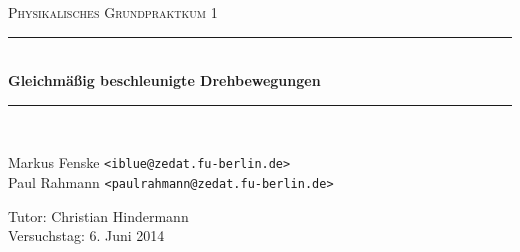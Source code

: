 \newcommand{\HRule}{\rule{\linewidth}{0.5mm}}

\begin{center}
  \textsc{\Large Physikalisches Grundpraktkum 1}
  \HRule\\[0.4 cm]
  {\huge \bfseries Gleichmäßig beschleunigte Drehbewegungen}
  \HRule\\[0.4 cm]

  \begin{minipage}{0.65\textwidth}
  \begin{flushleft}
    Markus Fenske \texttt{<iblue@zedat.fu-berlin.de>} \\
    Paul Rahmann \texttt{<paulrahmann@zedat.fu-berlin.de>}
  \end{flushleft}
  \end{minipage}
  \hfill
  \begin{minipage}{0.30\textwidth}
  \begin{flushright}
    Tutor: Christian Hindermann \\
    Versuchstag: 6. Juni 2014
  \end{flushright}
  \end{minipage}

  \vspace{1cm}

  \tableofcontents


  \vfill
\end{center}
\newpage
